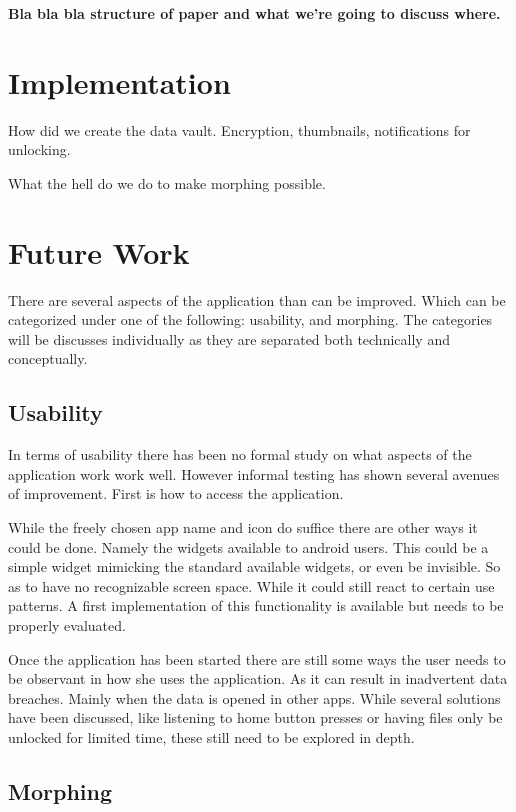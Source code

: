\documentclass[twocolumn,english,compsoc,journal]{IEEEtran}
\begin{document}
\textbf{Bla bla bla structure of paper and what we're going to discuss
where.}






\section{Implementation}

How did we create the data vault. Encryption, thumbnails, notifications
for unlocking.

What the hell do we do to make morphing possible.


\section{Future Work}

There are several aspects of the application than can be improved. Which
can be categorized under one of the following: usability, and morphing.
The categories will be discusses individually as they are separated both
technically and conceptually. 

\subsection{Usability}

In terms of usability there has been no formal study on what aspects of
the application work work well. However informal testing has shown several
avenues of improvement. First is how to access the application. 

While the freely chosen app name and icon do suffice there are other ways 
it could be done. Namely the widgets available to android users. This could 
be a simple widget mimicking the standard available widgets, or even be 
invisible. So as to have no recognizable screen space. While it could still
react to certain use patterns. A first implementation of this functionality is
available but needs to be properly evaluated.

Once the application has been started there are still some ways the user
needs to be observant in how she uses the application. As it can result in
inadvertent data breaches. Mainly when the data is opened in other apps.
While several solutions have been discussed, like listening to home button
presses or having files only be unlocked for limited time, these still need
to be explored in depth.

\subsection{Morphing}
\end{document}
